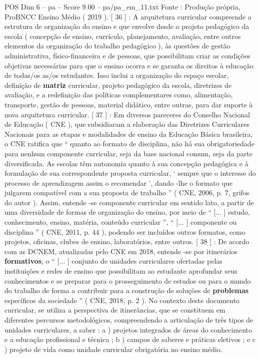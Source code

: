 \begin{textsample}{POS Dim 6 – pa – Score 9.00 – pa/pa\_em\_11.txt}
Fonte : Produção própria, ProBNCC Ensino Médio ( 2019 ). [ 36 ] : A arquitetura curricular compreende a estrutura de organização do ensino e que envolve desde o projeto pedagógico da escola ( concepção de ensino, currículo, planejamento, avaliação, entre outros elementos da organização do trabalho pedagógico ), às questões de gestão administrativa, físico-financeira e de pessoas, que possibilitam criar as condições objetivas necessárias para que o ensino ocorra e se garanta os direitos à educação de todas/os as/os estudantes.
Isso inclui a organização do espaço escolar, definição de \textbf{matriz} curricular, projeto pedagógico da escola, diretrizes de avaliação, e a redefinição das políticas complementares como, alimentação, transporte, gestão de pessoas, material didático, entre outras, para dar suporte à nova arquitetura curricular. [ 37 ] : Em diversos pareceres do Conselho Nacional de Educação ( CNE ), que subsidiaram a elaboração das Diretrizes Curriculares Nacionais para as etapas e modalidades de ensino da Educação Básica brasileira, o CNE ratifica que “ quanto ao formato de disciplina, não há sua obrigatoriedade para nenhum componente curricular, seja da base nacional comum, seja da parte diversificada.
As escolas têm autonomia quanto à sua concepção pedagógica e à formulação de sua correspondente proposta curricular, ‘ sempre que o interesse do processo de aprendizagem assim o recomendar ’, dando -lhe o formato que julgarem compatível com a sua proposta de trabalho ” ( CNE, 2006, p. 7, grifos do autor ).
Assim, entende -se componente curricular em sentido lato, a partir de uma diversidade de formas de organização do ensino, por meio de “ [... ] estudo, conhecimento, ensino, matéria, conteúdo curricular ”, “ [... ] componente ou disciplina ” ( CNE, 2011, p. 44 ), podendo ser incluídos outros formatos, como projetos, oficinas, clubes de ensino, laboratórios, entre outros. [ 38 ] : De acordo com as DCNEM, atualizadas pelo CNE em 2018, entende -se por itinerários \textbf{formativos}, o “ [... ] conjunto de unidades curriculares ofertadas pelas instituições e redes de ensino que possibilitam ao estudante aprofundar seus conhecimentos e se preparar para o prosseguimento de estudos ou para o mundo do trabalho de forma a contribuir para a construção de soluções de \textbf{problemas} específicos da sociedade ” ( CNE, 2018, p. 2 ).
No contexto deste documento curricular, se utiliza a perspectiva de itinerâncias, que se constituem em diferentes percursos metodológicos, compreendendo a articulação de três tipos de unidades curriculares, a saber : a ) projetos integrados de áreas do conhecimento e a educação profissional e técnica ; b ) campos de saberes e práticas eletivos ; e c ) projeto de vida como unidade curricular obrigatória no ensino médio.

\end{textsample}
